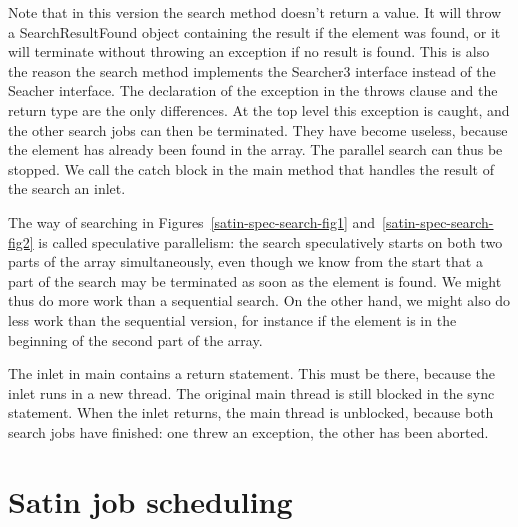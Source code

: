 \documentclass[10pt]{article}
\begin{document}
Note that in this version the search method doesn't return a value. It
will throw a SearchResultFound object containing the result if the
element was found, or it will terminate without throwing an exception
if no result is found. This is also the reason the search method
implements the Searcher3 interface instead of the Seacher
interface. The declaration of the exception in the throws clause and
the return type are the only differences.  At the top level this
exception is caught, and the other search jobs can then be
terminated. They have become useless, because the element has already
been found in the array. The parallel search can thus be stopped. We
call the catch block in the main method that handles the result of the
search an inlet.

The way of searching in Figures~\ref{satin-spec-search-fig1} and~\ref{satin-spec-search-fig2} is called
speculative parallelism: the search speculatively starts on both two
parts of the array simultaneously, even though we know from the start
that a part of the search may be terminated as soon as the element is
found. We might thus do more work than a sequential search. On the
other hand, we might also do less work than the sequential version,
for instance if the element is in the beginning of the second part of
the array.

The inlet in main contains a return statement. This must
be there, because the inlet runs in a new thread. The original main
thread is still blocked in the sync statement. When the inlet returns,
the main thread is unblocked, because both search jobs have finished:
one threw an exception, the other has been aborted.  

\section{Satin job scheduling}
\end{document}
